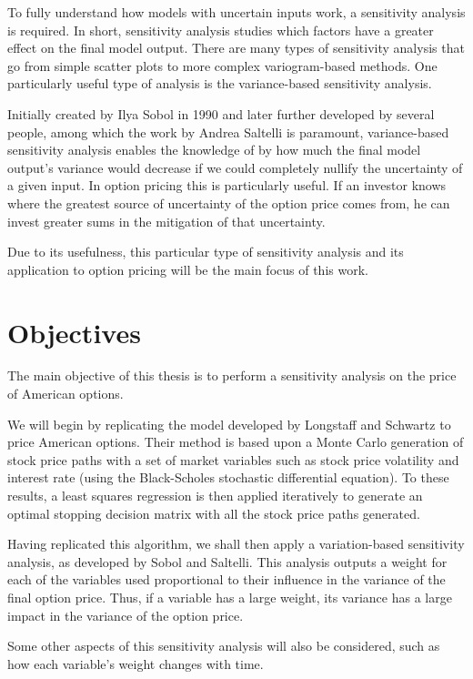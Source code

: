 \documentclass[a4paper,prd,twocolumn,nofootinbib,superscriptaddress,floatfix]{revtex4}
\begin{document}
To fully understand how models with uncertain inputs work, a sensitivity analysis is required. In short, sensitivity analysis studies which factors have a greater effect on the final model output.
There are many types of sensitivity analysis that go from simple scatter plots to more complex variogram-based methods. One particularly useful type of analysis is the variance-based sensitivity analysis.

Initially created by Ilya Sobol in 1990 and later further developed by several people, among which the work by Andrea Saltelli is paramount, variance-based sensitivity analysis enables the knowledge of by how much the final model output's variance would decrease if we could completely nullify the uncertainty of a given input.
In option pricing this is particularly useful. If an investor knows where the greatest source of uncertainty of the option price comes from, he can invest greater sums in the mitigation of that uncertainty.

Due to its usefulness, this particular type of sensitivity analysis and its application to option pricing will be the main focus of this work.



\section{Objectives}
The main objective of this thesis is to perform a sensitivity analysis on the price of American options.

We will begin by replicating the model developed by Longstaff and Schwartz to price American options. Their method is based upon a Monte Carlo generation of stock price paths with a set of market variables such as stock price volatility and interest rate (using the Black-Scholes stochastic differential equation). To these results, a least squares regression is then applied iteratively to generate an optimal stopping decision matrix with all the stock price paths generated.

Having replicated this algorithm, we shall then apply a variation-based sensitivity analysis, as developed by Sobol and Saltelli. This analysis outputs a weight for each of the variables used proportional to their influence in the variance of the final option price.
Thus, if a variable has a large weight, its variance has a large impact in the variance of the option price.

Some other aspects of this sensitivity analysis will also be considered, such as how each variable's weight changes with time.
\end{document}
